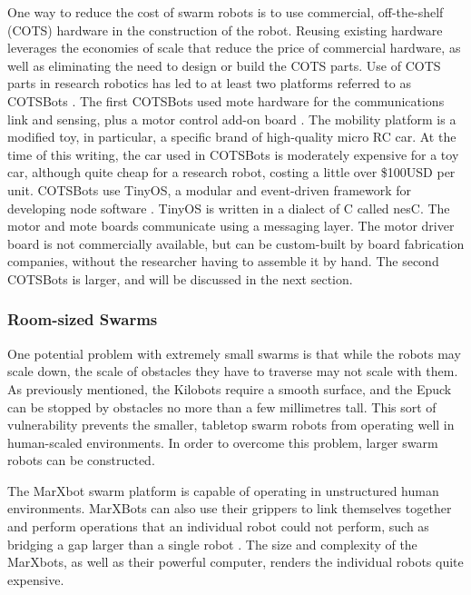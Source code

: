 \documentclass[]{article}
\begin{document}
One way to reduce the cost of swarm robots is to use commercial, off-the-shelf (COTS) hardware in the construction of the robot. 
Reusing existing hardware leverages the economies of scale that reduce the price of commercial hardware, as well as eliminating the need to design or build the COTS parts. 
Use of COTS parts in research robotics has led to at least two platforms referred to as COTSBots \cite{bergbreiter2003cotsbots, soule2011cotsbots}.
The first COTSBots used mote hardware for the communications link and sensing, plus a motor control add-on board \cite{bergbreiter2003cotsbots}. 
The mobility platform is a modified toy, in particular, a specific brand of high-quality micro RC car.
At the time of this writing, the car used in COTSBots is moderately expensive for a toy car, although quite cheap for a research robot, costing a little over \$100USD per unit. 
COTSBots use TinyOS, a modular and event-driven framework for developing node software \cite{levis2005tinyos}. 
TinyOS is written in a dialect of C called nesC. The motor and mote boards communicate using a messaging layer. 
The motor driver board is not commercially available, but can be custom-built by board fabrication companies, without the researcher having to assemble it by hand. 
The second COTSBots is larger, and will be discussed in the next section. 

\subsubsection{Room-sized Swarms}

One potential problem with extremely small swarms is that while the robots may scale down, the scale of obstacles they have to traverse may not scale with them. 
As previously mentioned, the Kilobots require a smooth surface, and the Epuck can be stopped by obstacles no more than a few millimetres tall. 
This sort of vulnerability prevents the smaller, tabletop swarm robots from operating well in human-scaled environments. 
In order to overcome this problem, larger swarm robots can be constructed.
 
The MarXbot swarm platform is capable of operating in unstructured human environments. 
MarXBots can also use their grippers to link themselves together and perform operations that an individual robot could not perform, such as bridging a gap larger than a single robot \cite{bonani2010marxbot}. 
The size and complexity of the MarXbots, as well as their powerful computer, renders the individual robots quite expensive. 
\end{document}
